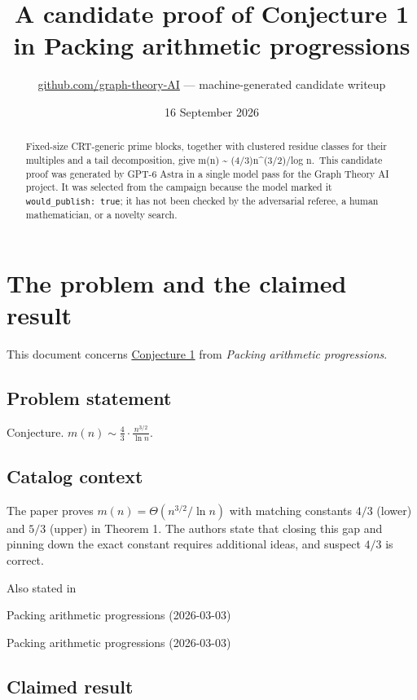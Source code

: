 \documentclass[
  11pt,
  a4paper,
]{article}
\title{A candidate proof of Conjecture 1 in Packing arithmetic
progressions}
\author{\href{https://github.com/graph-theory-AI}{github.com/graph-theory-AI}
--- machine-generated candidate writeup}
\date{16 September 2026}
\begin{document}
\maketitle
\begin{abstract}
Fixed-size CRT-generic prime blocks, together with clustered residue
classes for their multiples and a tail decomposition, give m(n)
\textasciitilde{} (4/3)n\^{}(3/2)/log n.~This candidate proof was
generated by GPT-6 Astra in a single model pass for the Graph Theory AI
project. It was selected from the campaign because the model marked it
\texttt{would\_publish:\ true}; it has not been checked by the
adversarial referee, a human mathematician, or a novelty search.
\end{abstract}

\section{The problem and the claimed
result}\label{the-problem-and-the-claimed-result}

This document concerns
\href{https://graph-theory-ai.github.io/graph-conjectures/arxiv/2603.02786__00/}{Conjecture
1} from \emph{Packing arithmetic progressions}.

\subsection{Problem statement}\label{problem-statement}

Conjecture. \(m(n)\sim\frac{4}{3}\cdot\frac{n^{3/2}}{\ln n}\).

\subsection{Catalog context}\label{catalog-context}

The paper proves \(m(n)=\Theta(n^{3/2}/\ln n)\) with matching constants
\(4/3\) (lower) and \(5/3\) (upper) in Theorem 1. The authors state that
closing this gap and pinning down the exact constant requires additional
ideas, and suspect \(4/3\) is correct.

Also stated in

Packing arithmetic progressions (2026-03-03)

Packing arithmetic progressions (2026-03-03)

\subsection{Claimed result}\label{claimed-result}
\end{document}
